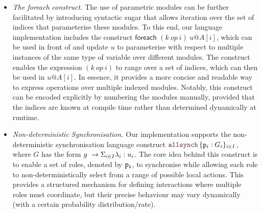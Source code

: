 \begin{itemize}
\item {\em The {\sf foreach} construct.} The use of parametric modules
  can be further facilitated by introducing syntactic sugar that
  allows iteration over the set of indices that parameterise these
  modules. To this end, our language implementation includes the
  construct $\textsf{foreach } (k\ \textit{op}\ i)\ u@A[i]$, which can
  be used in front of and update $u$ to parameterise with respect to
  multiple instances of the same type of variable over different
  modules.
  The construct enables the expression $(k\ \textit{op}\ i)$ to range
  over a set of indices, which can then be used in $u@A[i]$. In
  essence, it provides a more concise and readable way to express
  operations over multiple indexed modules. Notably, this construct
  can be encoded explicitly by numbering the modules manually,
  provided that the indices are known at compile time rather than
  determined dynamically at runtime.

\item {\em Non-deterministic Synchronisation.}  Our implementation
  supports the non-deterministic synchronisation language construct
  $\allsynch pGiI$, where $G$ has the form $g\ \rightarrow \Sigma_{i\in I}\lambda_i: u_i$. The core idea behind this construct is to enable a set of roles,
  denoted by $\mathtt{p_i}$, to synchronise while allowing each role to
  non-deterministically select from a range of possible local
  actions. This provides a structured mechanism for defining
  interactions where multiple roles must coordinate, but their precise
  behaviour may vary dynamically (with a certain probability
  distribution/rate).


\end{itemize}

